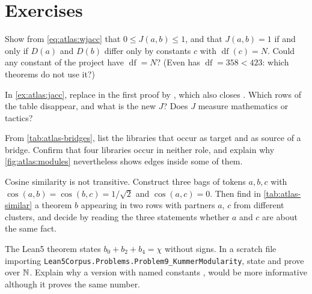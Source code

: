 \section*{Exercises}

\begin{exercise}[$\star$]\label{ex:atlas:jbound}
Show from \eqref{eq:atlas:wjacc} that $0\le J(a,b)\le1$, and that $J(a,b)=1$ if and only
if $D(a)$ and $D(b)$ differ only by constants $c$ with $\operatorname{df}(c)=N$. Could any
constant of the project have $\operatorname{df}=N$? (Even  has
$\operatorname{df}=358<423$: which theorems do not use it?)
\end{exercise}

\begin{exercise}[$\star$]
In \cref{ex:atlas:jacc}, replace  in the first proof by , which
also closes . Which rows of the table disappear, and what
is the new $J$? Does $J$ measure mathematics or tactics?
\end{exercise}

\begin{exercise}[$\star$]
From \cref{tab:atlas-bridges}, list the libraries that occur as target and as source of a
bridge. Confirm that four libraries occur in neither role, and explain why
\cref{fig:atlas:modules} nevertheless shows edges inside some of them.
\end{exercise}

\begin{exercise}[$\star\star$]
Cosine similarity is not transitive. Construct three bags of tokens $a,b,c$ with
$\cos(a,b)=\cos(b,c)=1/\sqrt2$ and $\cos(a,c)=0$. Then find in \cref{tab:atlas-similar} a
theorem $b$ appearing in two rows with partners $a$, $c$ from different clusters, and
decide by reading the three statements whether $a$ and $c$ are about the same fact.
\end{exercise}

\begin{exercise}[$\star\star$]
The Lean5 theorem  states $b_0+b_2+b_4=\chi$
without signs. In a scratch file importing
\texttt{Lean5Corpus.Problems.Problem9\_KummerModularity}, state and prove
 over $\mathbb{N}$.
Explain why a version with named constants ,  would
be more informative although it proves the same number.
\end{exercise}

